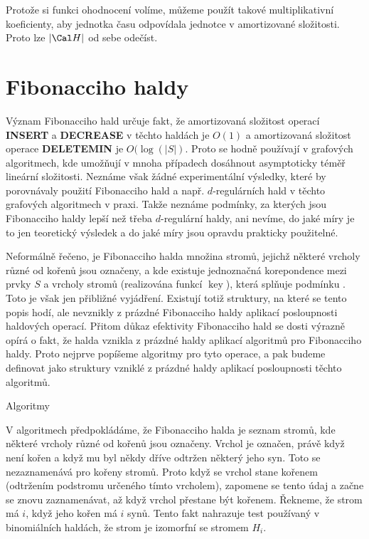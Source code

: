 \documentclass[a4paper,12pt]{article}
\def \emph#1{\underbar{#1}}
\DeclareMathOperator*{\key}{key}
\begin{document}
Protože si funkci ohodnocení volíme, 
můžeme použít takové multiplikativní 
koeficienty, aby jednotka času odpovídala jednotce v 
amortizované složitosti. Proto lze $|\Cal H|$ od sebe odečíst.

\section{{Fibonacciho haldy}}

Význam Fibonacciho hald určuje fakt, že amortizovaná 
složitost operací {\bf INSERT} a {\bf DECREASE} v těchto haldách je 
$O(1)$ a amortizovaná složitost operace {\bf DELETEMIN} je $
O(\log(|S|)$. 
Proto se hodně používají v grafových algoritmech, 
kde umožňují v mnoha případech dosáhnout asymptoticky téměř lineární 
složitosti. Neznáme však žádné  
expe\-rimentální výsledky, které by porovnávaly použití Fibonacciho 
hald a např. $d$-regulárních hald v těchto grafových 
algoritmech v praxi. Takže neznáme podmínky, za 
kterých jsou Fibonacciho 
haldy lepší než třeba $d$-regulární haldy, 
ani nevíme, do jaké míry je to jen teoretický 
výsledek a do jaké míry jsou opravdu prakticky použitelné. 

Neformálně řečeno, je Fibonacciho halda množina 
stromů, jejichž některé vrcholy různé od 
kořenů jsou označeny, a kde existuje 
jednoznačná korepondence mezi prvky $S$ a vrcholy 
stromů (realizována funkcí $\key$), která splňuje 
podmínku .  Toto je však jen přibliž\-né 
vyjádření.  Existují totiž struktury, na které se tento 
popis hodí, ale 
nevznikly z prázd\-né Fibonacciho haldy aplikací 
posloupnosti haldových  
operací.  Přitom důkaz efekti\-vity Fibonacciho hald se 
dosti výrazně opírá o fakt, že halda vznikla z prázdné 
haldy aplikací algoritmů pro Fibonacciho 
haldy. Proto nejprve popíšeme algoritmy pro tyto 
ope\-race, a pak budeme
definovat \emph{Fibonacciho} \emph{haldy} jako struktury 
vzniklé z prázdné haldy aplikací posloupnosti 
těchto algoritmů.

\head
Algoritmy
\endhead

V algoritmech předpokládáme, že Fibonacciho halda je 
seznam stromů, kde některé vrcholy různé od 
kořenů jsou označeny.  Vrchol je označen, právě když není 
kořen a když mu byl někdy dříve odtržen některý jeho syn. Toto se 
nezaznamenává pro kořeny stromů. Proto když se 
vrchol stane kořenem (odtržením podstromu určeného 
tímto vrcholem),  
zapomene  se tento údaj a začne se znovu zaznamenávat, 
až když vrchol přestane 
být kořenem. \v Rekneme, že strom má \emph{rank} $i$, když 
jeho kořen 
má $i$ synů. Tento fakt nahrazuje test používaný 
v binomiálních 
haldách, že strom je izomorfní se stromem $H_i$. 
\end{document}

